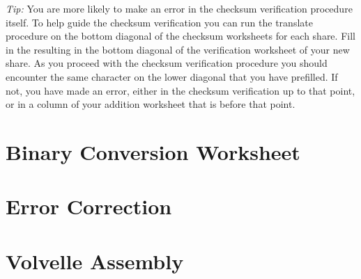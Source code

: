 \documentclass{article}
\newcommand{\tmem}[1]{{\em #1\/}}
\begin{document}
{\tmem{Tip:}} You are more likely to make an error in the checksum
verification procedure itself. To help guide the checksum verification you can
run the translate procedure on the bottom diagonal of the checksum worksheets
for each share. Fill in the resulting in the bottom diagonal of the
verification worksheet of your new share. As you proceed with the checksum
verification procedure you should encounter the same character on the lower
diagonal that you have prefilled. If not, you have made an error, either in
the checksum verification up to that point, or in a column of your addition
worksheet that is before that point.

\section{Binary Conversion Worksheet}

\section{Error Correction}

\section{Volvelle Assembly}
\end{document}
